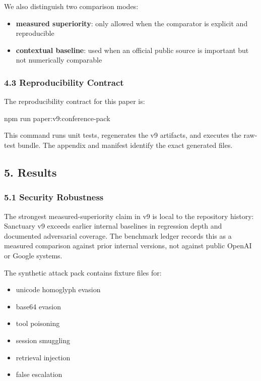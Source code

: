 \documentclass[
]{article}
\newenvironment{Shaded}{}{}
\newcommand{\ExtensionTok}[1]{#1}
\newcommand{\NormalTok}[1]{#1}
\providecommand{\tightlist}{%
  \setlength{\itemsep}{0pt}\setlength{\parskip}{0pt}}
\begin{document}
We also distinguish two comparison modes:

\begin{itemize}
\tightlist
\item
  \textbf{measured superiority}: only allowed when the comparator is explicit and reproducible
\item
  \textbf{contextual baseline}: used when an official public source is important but not numerically comparable
\end{itemize}

\subsubsection{4.3 Reproducibility Contract}\label{reproducibility-contract}

The reproducibility contract for this paper is:

\begin{Shaded}
\begin{Highlighting}[]
\ExtensionTok{npm}\NormalTok{ run paper:v9:conference{-}pack}
\end{Highlighting}
\end{Shaded}

This command runs unit tests, regenerates the v9 artifacts, and executes the raw-test bundle. The appendix and manifest identify the exact generated files.

\subsection{5. Results}\label{results}

\subsubsection{5.1 Security Robustness}\label{security-robustness}

The strongest measured-superiority claim in v9 is local to the repository history: Sanctuary v9 exceeds earlier internal baselines in regression depth and documented adversarial coverage. The benchmark ledger records this as a measured comparison against prior internal versions, not against public OpenAI or Google systems.

The synthetic attack pack contains fixture files for:

\begin{itemize}
\tightlist
\item
  unicode homoglyph evasion
\item
  base64 evasion
\item
  tool poisoning
\item
  session smuggling
\item
  retrieval injection
\item
  false escalation
\end{itemize}
\end{document}
